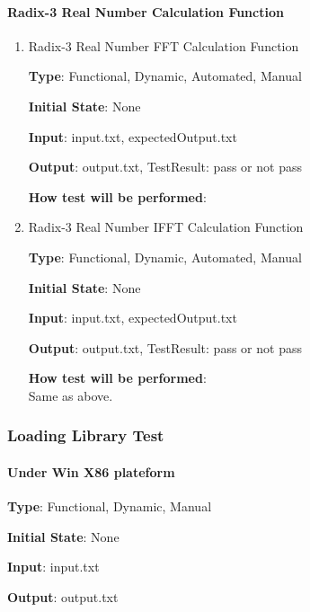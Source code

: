 \documentclass[12pt, titlepage]{article}
\begin{document}
\paragraph{Radix-3 Real Number Calculation Function\\}

\begin{enumerate}

\item{Radix-3 Real Number FFT Calculation Function\\}

\textbf {Type}: Functional, Dynamic, Automated, Manual
					
\textbf {Initial State}: None
					
\textbf {Input}: input.txt, expectedOutput.txt
					
\textbf {Output}:  output.txt, TestResult: pass or not pass
					
\textbf {How test will be performed}: \\


\item{Radix-3 Real Number IFFT Calculation Function\\}

\textbf {Type}: Functional, Dynamic, Automated, Manual
					
\textbf {Initial State}: None
					
\textbf {Input}: input.txt, expectedOutput.txt
					
\textbf {Output}:  output.txt, TestResult: pass or not pass

\textbf {How test will be performed}: \\
Same as above.
\end{enumerate}

\subsubsection{Loading Library Test}

\paragraph{Under Win X86 plateform\\}

\textbf {Type}: Functional, Dynamic, Manual
					
\textbf {Initial State}: None
					
\textbf {Input}: input.txt
					
\textbf {Output}: output.txt
					
\end{document}
